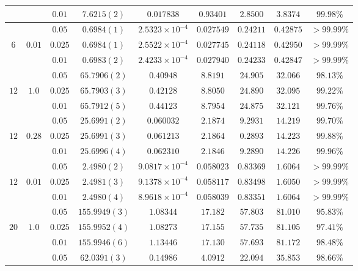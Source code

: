 \documentclass[a4paper,10pt,twocolumn]{article} %
\begin{document}
\begin{table*}[ht!]
\begin{center}
\begin{tabular}{|c|c|c|c|c|c|c|c|c|}
 	 & 			& $0.01$  & $7.6215(2)$ & $0.017838$ & $0.93401$ & $2.8500$ & $3.8374$ & $99.98\%$\\ 
\hline
     &      	& $0.05$   & $0.6984(1)$ & $2.5323\times10^{-4}$ & $0.027549$ & $0.24211$ & $0.42875$ & $>99.99\%$\\ 
 $6$ & $0.01$	& $0.025$  & $0.6984(1)$ & $2.5522\times10^{-4}$ & $0.027745$ & $0.24118$ & $0.42950$ & $>99.99\%$\\ 
 	 & 			& $0.01$   & $0.6983(2)$ & $2.4233\times10^{-4}$ & $0.027940$ & $0.24233$ & $0.42847$ & $>99.99\%$\\ 
\hline
\hline
 	 & 			& $0.05$  & $65.7906(2)$ & $0.40948$ & $8.8191$ & $24.905$ & $32.066$ & $98.13\%$\\ 
 $12$& $1.0$ 	& $0.025$ & $65.7903(3)$ & $0.42128$ & $8.8050$ & $24.890$ & $32.095$ & $99.22\%$\\ 
 	 & 			& $0.01$  & $65.7912(5)$ & $0.44123$ & $8.7954$ & $24.875$ & $32.121$ & $99.76\%$\\ 
\hline
 	 & 	 		& $0.05$  & $25.6991(2)$ & $0.060032$ & $2.1874$ & $9.2931$ & $14.219$ &$99.70\%$\\ 
 $12$& 	$0.28$	& $0.025$ & $25.6991(3)$ & $0.061213$ & $2.1864$ & $0.2893$ & $14.223$ &$99.88\%$\\ 
 	 & 			& $0.01$  & $25.6996(4)$ & $0.062310$ & $2.1846$ & $9.2890$ & $14.226$ &$99.96\%$\\ 
\hline
 	  & 		& $0.05$  & $2.4980(2)$ & $9.0817\times10^{-4}$ & $0.058023$ & $0.83369$ & $1.6064$ & $>99.99\%$\\ 
 $12$ & $0.01$	& $0.025$ & $2.4981(3)$ & $9.1378\times10^{-4}$ & $0.058117$ & $0.83498$ & $1.6050$ & $>99.99\%$\\ 
 	  & 		& $0.01$  & $2.4980(4)$ & $8.9618\times10^{-4}$ & $0.058039$ & $0.83351$ & $1.6064$ & $>99.99\%$\\ 
\hline
\hline
	& 	 	& $0.05$  & $155.9949(3)$ & $1.08344$ & $17.182$ & $57.803$ & $81.010$ &$95.83\%$\\ 
$20$& $1.0$	& $0.025$ & $155.9952(4)$ & $1.08273$ & $17.155$ & $57.735$ & $81.105$ &$97.41\%$\\ 
 	&  		& $0.01$  & $155.9946(6)$ & $1.13446$ & $17.130$ & $57.693$ & $81.172$ &$98.48\%$\\ 
\hline
	& 		& $0.05$   & $62.0391(3)$ & $0.14986$ & $4.0912$ & $22.094$ & $35.853$ & $98.66\%$\\


\end{tabular}
\end{center}
\end{table*}
\end{document}
